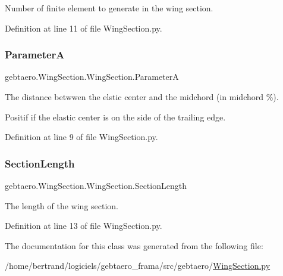 Number of finite element to generate in the wing section. 



Definition at line 11 of file Wing\+Section.\+py.

\mbox{\label{classgebtaero_1_1_wing_section_1_1_wing_section_a0da2330696a15bce08b3ac29b2efaf17}} 
\subsubsection{\texorpdfstring{ParameterA}{ParameterA}}
{\footnotesize\ttfamily gebtaero.\+Wing\+Section.\+Wing\+Section.\+ParameterA}



The distance betwwen the elstic center and the midchord (in midchord \%). 

Positif if the elastic center is on the side of the trailing edge. 

Definition at line 9 of file Wing\+Section.\+py.

\mbox{\label{classgebtaero_1_1_wing_section_1_1_wing_section_a87909d32978a886e9e329df69f7d918e}} 
\subsubsection{\texorpdfstring{Section\+Length}{SectionLength}}
{\footnotesize\ttfamily gebtaero.\+Wing\+Section.\+Wing\+Section.\+Section\+Length}



The length of the wing section. 



Definition at line 13 of file Wing\+Section.\+py.



The documentation for this class was generated from the following file\+:\begin{DoxyCompactItemize}
\item 
/home/bertrand/logiciels/gebtaero\+\_\+frama/src/gebtaero/\hyperlink{_wing_section_8py}{Wing\+Section.\+py}\end{DoxyCompactItemize}

